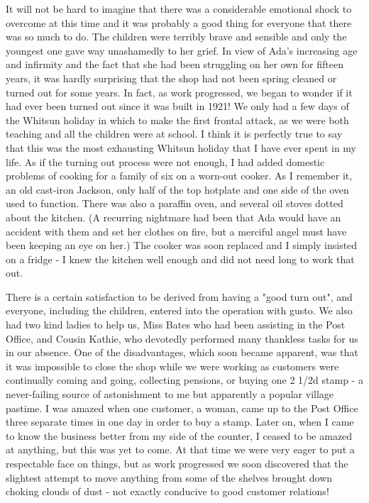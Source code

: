 It will not be hard to imagine that there was a considerable emotional shock to overcome at this time and it was probably a good thing for everyone that there was so much to do. The children were terribly brave and sensible and only the youngest one gave way unashamedly to her grief. In view of Ada's increasing age and infirmity and the fact that she had been struggling on her own for fifteen years, it was hardly surprising that the shop had not been spring cleaned or turned out for some years. In fact, as work progressed, we began to wonder if it had ever been turned out since it was built in 1921! We only had a few days of the Whitsun holiday in which to make the first frontal attack, as we were both teaching and all the children were at school. I think it is perfectly true to say that this was the most exhausting Whitsun holiday that I have ever spent in my life. As if the turning out process were not enough, I had added domestic problems of cooking for a family of six on a worn-out cooker. As I remember it, an old cast-iron Jackson, only half of the top hotplate and one side of the oven used to function. There was also a paraffin oven, and several oil stoves dotted about the kitchen. (A recurring nightmare had been that Ada would have an accident with them and set her clothes on fire, but a merciful angel must have been keeping an eye on her.) The cooker was soon replaced and I simply insisted on a fridge - I knew the kitchen well enough and did not need long to work that out.

There is a certain satisfaction to be derived from having a "good turn out", and everyone, including the children, entered into the operation with gusto. We also had two kind ladies to help us, Miss Bates who had been assisting in the Post Office, and Cousin Kathie, who devotedly performed many thankless tasks for us in our absence. One of the disadvantages, which soon became apparent, was that it was impossible to close the shop while we were working as customers were continually coming and going, collecting pensions, or buying one 2 1/2d stamp - a never-failing source of astonishment to me but apparently a popular village pastime. I was amazed when one customer, a woman, came up to the Post Office three separate times in one day in order to buy a stamp. Later on, when I came to know the business better from my side of the counter, I ceased to be amazed at anything, but this was yet to come. At that time we were very eager to put a respectable face on things, but as work progressed we soon discovered that the slightest attempt to move anything from some of the shelves brought down choking clouds of dust - not exactly conducive to good customer relations!

